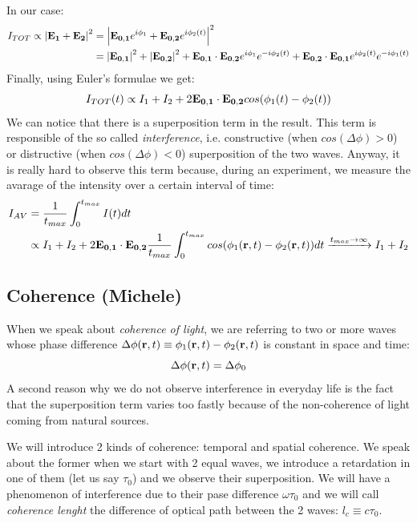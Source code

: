 \documentclass[11pt,a4paper]{article}
\begin{document}
In our case:
\begin{align*}
I_{TOT}\propto \abs{\vb{E_1}+\vb{E_2}}^2 &=\abs{\vb{E_{0,1}}e^{i\phi_1}+\vb{E_{0,2}}e^{i\phi_2(t)}}^2\\
&=\abs{\vb{E_{0,1}}}^2+\abs{\vb{E_{0,2}}}^2+\vb{E_{0,1}}\cdot \vb{E_{0,2}}e^{i\phi_1}e^{-i\phi_2(t)}+\vb{E_{0,2}}\cdot \vb{E_{0,1}}e^{i\phi_2(t)}e^{-i\phi_1(t)}
\end{align*}
Finally, using Euler's formulae we get:
\begin{equation}
I_{TOT}(t)\propto I_1+I_2+2\vb{E_{0,1}}\cdot \vb{E_{0,2}}cos(\phi_1(t)-\phi_2(t))
\end{equation}
We can notice that there is a superposition term in the result. This term is responsible of the so called \emph{interference}, i.e. constructive (when $cos(\Delta\phi)>0$) or distructive (when $cos(\Delta\phi)<0$) superposition of the two waves.  Anyway, it is really hard to observe this term because, during an experiment, we measure the avarage of the intensity over a certain interval of time:
\begin{align*}
I_{AV} &= \frac{1}{t_{max}}\int_0^{t_{max}}I(t)dt\\ &\propto I_1+I_2+ 2\vb{E_{0,1}}\cdot \vb{E_{0,2}} \frac{1}{t_{max}} \int_0^{t_{max}} cos(\phi_1(\vb{r},t)-\phi_2(\vb{r},t)) dt\xrightarrow{t_{max}\rightarrow \infty} I_1+I_2
\end{align*}


\subsection{Coherence (Michele)}
When we speak about \emph{coherence of light}, we are referring to two or more waves whose phase difference $\Delta\phi(\vb{r},t)\equiv \phi_1(\vb{r},t)-\phi_2(\vb{r},t)$ is constant in space and time:
\begin{equation}
\Delta\phi(\vb{r},t)=\Delta\phi_0
\end{equation}
A second reason why we do not observe interference in everyday life is the fact that the superposition term varies too fastly because of the non-coherence of light coming from natural sources.

We will introduce 2 kinds of coherence: temporal and spatial coherence. We speak about the former when we start with 2 equal waves, we introduce a retardation in one of them (let us say $\tau_0$) and we observe their superposition. We will have a phenomenon of interference due to their pase difference $\omega \tau_0$ and we will call \emph{coherence lenght} the difference of optical path between the 2 waves: $l_c\equiv c\tau_0$.
\end{document}
